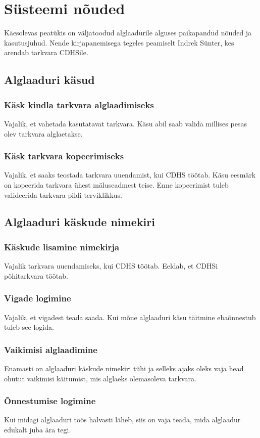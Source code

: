 \documentclass[12pt,a4paper]{article}
\begin{document}
\section{Süsteemi nõuded}
Käesolevas peatükis on väljatoodud alglaadurile alguses paikapandud nõuded ja
kasutusjuhud. Nende kirjapanemisega tegeles peamiselt Indrek Sünter, kes arendab
tarkvara CDHSile. 
\subsection{Alglaaduri käsud}
\subsubsection{Käsk kindla tarkvara alglaadimiseks}
Vajalik, et vahetada kasutatavat tarkvara. Käsu abil saab valida millises pesas
olev tarkvara alglaetakse.

\subsubsection{Käsk tarkvara kopeerimiseks}
Vajalik, et saaks teostada tarkvara uuendamist, kui CDHS töötab. Käsu eesmärk on
kopeerida tarkvara ühest mäluseadmest teise. Enne kopeerimist tuleb
valideerida tarkvara pildi terviklikkus.

\subsection{Alglaaduri käskude nimekiri}
\subsubsection{Käskude lisamine nimekirja}
Vajalik tarkvara uuendamiseks, kui CDHS töötab. Eeldab, et CDHSi põhitarkvara
töötab.

\subsubsection{Vigade logimine}
Vajalik, et vigadest teada saada. Kui mõne alglaaduri käsu täitmine ebaõnnestub
tuleb see logida.

\subsubsection{Vaikimisi alglaadimine}
Enamasti on alglaaduri käskude nimekiri tühi ja selleks ajaks oleks vaja head
ohutut vaikimisi käitumist, mis alglaeks olemasoleva tarkvara.

\subsubsection{Õnnestumise logimine}
Kui midagi alglaaduri töös halvasti läheb, siis on vaja teada, mida alglaadur
edukalt juba ära tegi.
\end{document}
